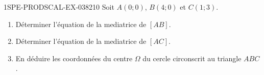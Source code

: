 \begin{exercice}{1SPE-PRODSCAL-EX-038}{2}{10}
Soit $A(0; 0)$, $B(4; 0)$ et $C(1; 3)$.
\begin{enumerate}
  \item Déterminer l'équation de la mediatrice de $[AB]$.
  \item Déterminer l'équation de la mediatrice de $[AC]$.
  \item En déduire les coordonnées du centre $\Omega$ du cercle circonscrit au triangle $ABC$.
\end{enumerate}
\end{exercice}
